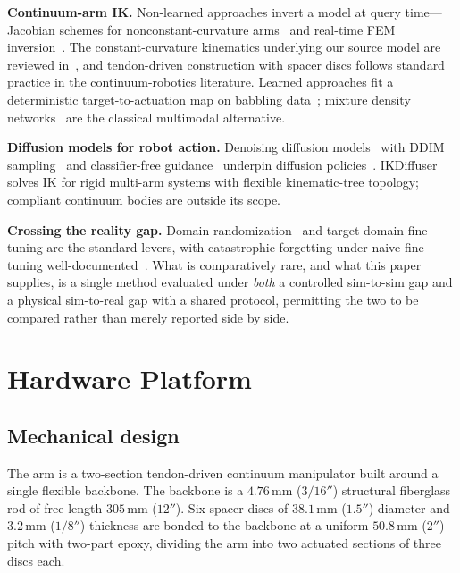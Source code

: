 \documentclass[letterpaper, 10pt, conference]{ieeeconf}
\begin{document}
\textbf{Continuum-arm IK.} Non-learned approaches invert a model at query
time---Jacobian schemes for nonconstant-curvature
arms~\cite{giorelli2015neural} and real-time FEM
inversion~\cite{duriez2013control}. The constant-curvature kinematics
underlying our source model are reviewed in~\cite{webster2010design}, and
tendon-driven construction with spacer discs follows standard practice in the
continuum-robotics literature. Learned approaches fit a deterministic
target-to-actuation map on babbling data~\cite{giorelli2015neural}; mixture
density networks~\cite{bishop1994mixture} are the classical multimodal
alternative.

\textbf{Diffusion models for robot action.} Denoising diffusion
models~\cite{ho2020denoising} with DDIM sampling~\cite{song2021denoising} and
classifier-free guidance~\cite{ho2022classifier} underpin diffusion
policies~\cite{chi2023diffusion}. IKDiffuser~\cite{zhang2025ikdiffuser} solves
IK for rigid multi-arm systems with flexible kinematic-tree topology;
compliant continuum bodies are outside its scope.

\textbf{Crossing the reality gap.} Domain
randomization~\cite{tobin2017domain} and target-domain fine-tuning are the
standard levers, with catastrophic forgetting under naive fine-tuning
well-documented~\cite{kirkpatrick2017overcoming}. What is comparatively rare,
and what this paper supplies, is a single method evaluated under \emph{both}
a controlled sim-to-sim gap and a physical sim-to-real gap with a shared
protocol, permitting the two to be compared rather than merely reported
side by side.

\section{Hardware Platform}
\label{sec:hardware}

\subsection{Mechanical design}

The arm is a two-section tendon-driven continuum manipulator built around a
single flexible backbone. The backbone is a $4.76\,$mm ($3/16''$) structural
fiberglass rod of free length $305\,$mm ($12''$). Six spacer discs of
$38.1\,$mm ($1.5''$) diameter and $3.2\,$mm ($1/8''$) thickness are bonded to
the backbone at a uniform $50.8\,$mm ($2''$) pitch with two-part epoxy,
dividing the arm into two actuated sections of three discs each.
\end{document}
